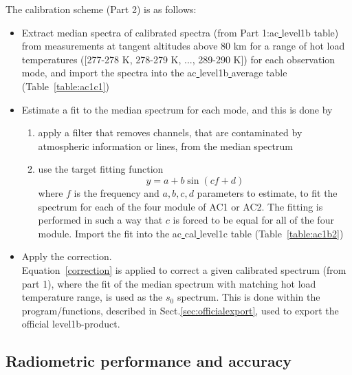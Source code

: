 The calibration scheme (Part 2) is as follows:
\begin{itemize}
\item Extract median spectra of calibrated spectra 
(from Part 1:ac\underline{ }level1b table) 
from measurements at tangent altitudes above 80 km for a range of hot load 
temperatures ([277-278 K, 278-279 K, ..., 289-290 K]) 
for each observation mode, and import the spectra
into the ac\underline{ }level1b\underline{ }average table
(Table~\ref{table:ac1c1})
\item Estimate a fit to the median spectrum for each mode, and this is done
by
\begin{enumerate}
\item apply a filter that removes channels, that are contaminated by 
atmospheric information or lines, from the median spectrum 
\item use the target fitting function  
\begin{equation}
y=a+ b\sin(cf+d)
\end{equation}
where \(f\) is the frequency and \(a,b,c,d\) parameters to estimate,
to fit the spectrum for each of the four module of AC1 or AC2.
The fitting is performed in such a way that \(c\) is forced 
to be equal for all of the four module. 
Import the fit into the ac\underline{ }cal\underline{ }level1c
table (Table~\ref{table:ac1b2})
\end{enumerate}
\item Apply the correction.\\
Equation~\ref{correction} is applied to correct a given calibrated 
spectrum (from part 1), where the fit of the median spectrum
with matching hot load temperature range, is used as the \(s_{0}\)
spectrum. 
This is done within the program/functions, described in
Sect.\ref{sec:officialexport}, used to export the official
level1b-product.  
\end{itemize}



\subsection{Radiometric performance and accuracy}


